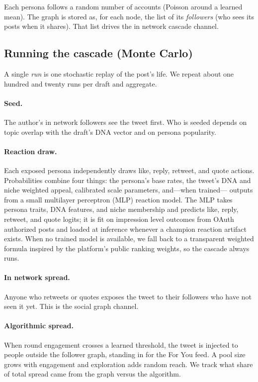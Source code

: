 \documentclass[11pt]{article}
\begin{document}
Each persona follows a random number of accounts (Poisson around a learned mean).
The graph is stored as, for each node, the list of its \emph{followers} (who sees
its posts when it shares). That list drives the in network cascade channel.

\subsection{Running the cascade (Monte Carlo)}
A single \emph{run} is one stochastic replay of the post's life. We repeat about
one hundred and twenty runs per draft and aggregate.

\paragraph{Seed.}
The author's in network followers see the tweet first. Who is seeded depends on
topic overlap with the draft's DNA vector and on persona popularity.

\paragraph{Reaction draw.}
Each exposed persona independently draws like, reply, retweet, and quote actions.
Probabilities combine four things: the persona's base rates, the tweet's DNA and
niche weighted appeal, calibrated scale parameters, and---when trained---
outputs from a small multilayer perceptron (MLP) reaction model. The MLP takes
persona traits, DNA features, and niche membership and predicts like, reply,
retweet, and quote logits; it is fit on impression level outcomes from
OAuth authorized posts and loaded at inference whenever a champion reaction
artifact exists. When no trained model is available, we fall back to a
transparent weighted formula inspired by the platform's public ranking weights,
so the cascade always runs.

\paragraph{In network spread.}
Anyone who retweets or quotes exposes the tweet to their followers who have not
seen it yet. This is the social graph channel.

\paragraph{Algorithmic spread.}
When round engagement crosses a learned threshold, the tweet is injected to
people outside the follower graph, standing in for the For You feed. A pool size
grows with engagement and exploration adds random reach. We track what share of
total spread came from the graph versus the algorithm.
\end{document}
